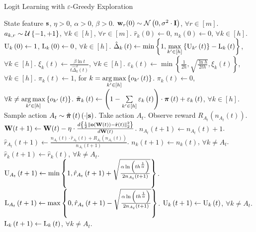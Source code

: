 \begin{algorithm}[t]
	\caption{Logit Learning with $\varepsilon$-Greedy Exploration}
	\label{alg:logit_learning_eps_greedy_exploration}
	\begin{algorithmic}
		 State feature ${\mathbf{s}}$, $\eta > 0$, $\alpha > 0$, $\beta > 0$.
		\STATE ${\mathbf{w}}_r(0) \sim {\mathcal{N}}\left( 0, \sigma^2 \cdot {\mathbf{I}} \right)$, $\forall r \in [m]$.
		\STATE $a_{k, r} \sim {\mathcal{U}}\left\{-1, +1\right\}$, $\forall k \in [h]$, $\forall r \in [m]$.
		\STATE $\hat{r}_{k}\left(0\right) \gets 0$, $n_{k}\left(0\right) \gets 0$, $\forall k \in [h]$.
		\STATE ${\text{U}}_k\left(0\right) \gets 1$, ${\text{L}}_k\left(0\right) \gets 0$, $\forall k \in [h]$.
		\STATE $\hat{\Delta}_{k}\left(t\right) \gets \min\left\{ 1,  \max\limits_{k^\prime \in \left[h\right]}\left\{ {\text{U}}_{k^\prime}\left(t\right) \right\}  - {\text{L}}_{k}\left(t\right)\right\} $, $\forall k \in [h]$.
		\STATE $\xi_k\left(t\right) \gets \frac{\beta \ln{t}}{t \hat{\Delta}_k^2\left(t\right)}$, $\forall k \in [h]$.
		\STATE $\varepsilon_k\left(t\right) \gets \min\left\{ \frac{1}{2 h}, \sqrt{\frac{\ln{h}}{2 t h}},  \xi_k\left(t\right) \right\}$, $\forall k \in [h]$.
		\STATE $\pi_{k}\left(t\right) \gets 1$, for $k = \operatorname*{arg\,max}\limits_{k^\prime \in \left[h\right]}\left\{ o_{ k^\prime}\left(t\right)\right\}$.
		\STATE $\pi_{k}\left(t\right) \gets 0$, $\forall k \not= \operatorname*{arg\,max}\limits_{k^\prime \in \left[h\right]}\left\{ o_{ k^\prime}\left(t\right)\right\}$.
		\STATE $\tilde{{\boldsymbol{\pi}}}_k\left(t\right) \gets \left( 1 - \sum\limits_{k^\prime \in [h]}{\varepsilon_k\left(t\right)} \right) \cdot  {\boldsymbol{\pi}}\left(t\right) + \varepsilon_k\left(t\right)$, $\forall k \in [h]$.
		\STATE Sample action $A_{t} \sim \tilde{{\boldsymbol{\pi}}}\left(t\right)\left(\cdot \middle| {\mathbf{s}} \right)$.
		\STATE Take action $A_{t}$. Observe reward $R_{ A_{t}}\left(n_{ A_{t}}\left(t\right) \right)$.
		\STATE ${\mathbf{W}}(t+1) \leftarrow {\mathbf{W}}(t) - \eta \cdot \frac{d \left\{ \frac{1}{2} \left\| {\mathbf{o}}\left( {\mathbf{W}}\left(t\right)\right) - \hat{{\mathbf{r}}}\left(t\right) \right\|_2^2 \right\}}{d {\mathbf{W}}(t)}$.
		\STATE $n_{A_{t}}\left(t+1\right) \gets n_{ A_{t}}\left(t\right) + 1$.
		\STATE $\hat{r}_{A_{t}}\left(t+1\right) \gets \frac{n_{ A_{t}}\left(t\right) \cdot \hat{r}_{A_{t}}\left(t\right) + R_{A_{t}}\left(n_{A_{t}}\left(t\right)\right) }{n_{ A_{t}}\left(t+1\right)}$.
		\STATE $n_{k}\left(t+1\right) \gets n_{ k}\left(t\right)$, $\forall k \not= A_t$.
		\STATE $\hat{r}_{k}\left(t+1\right) \gets \hat{r}_{k}\left(t\right)$, $\forall k \not= A_t$.
		\STATE ${\text{U}}_{A_t}\left(t+1\right) \gets \min{\left\{ 1, \hat{r}_{A_{t}}\left(t+1\right) + \sqrt{\frac{\alpha \ln{\left( t h^{\frac{1}{\alpha}}\right)}}{2 n_{A_t}\left(t+1\right)}}\right\}}$.
		\STATE ${\text{L}}_{A_t}\left(t+1\right) \gets \max{\left\{ 0, \hat{r}_{A_{t}}\left(t+1\right) - \sqrt{\frac{\alpha \ln{\left( t h^{\frac{1}{\alpha}}\right)}}{2 n_{A_t}\left(t+1\right)}}\right\}}$.
		\STATE ${\text{U}}_{k}\left(t+1\right) \gets {\text{U}}_{k}\left(t\right)$, $\forall k \not= A_t$.
		\STATE ${\text{L}}_{k}\left(t+1\right) \gets {\text{L}}_{k}\left(t\right)$, $\forall k \not= A_t$.
		\ENDFOR
	\end{algorithmic}
\end{algorithm}